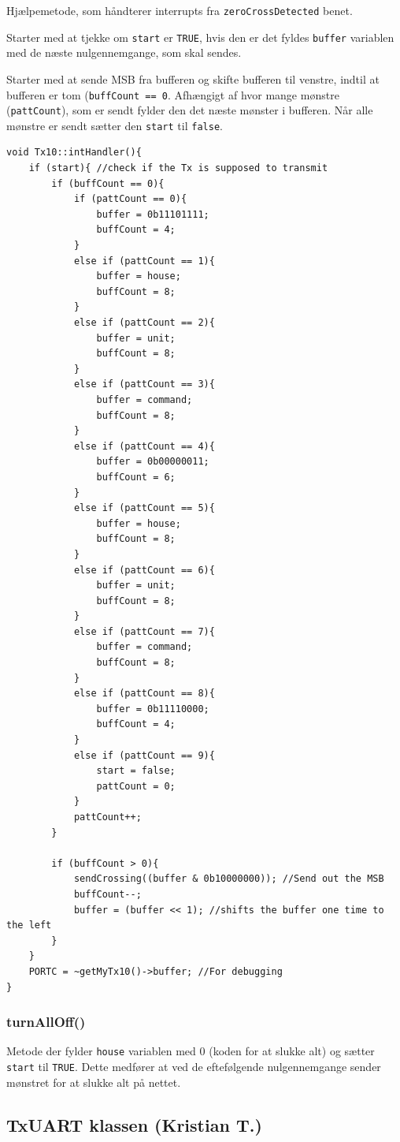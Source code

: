 Hjælpemetode, som håndterer interrupts fra \texttt{zeroCrossDetected} benet. 

Starter med at tjekke om \texttt{start} er \texttt{TRUE}, hvis den er det fyldes \texttt{buffer} variablen med de næste nulgennemgange, som skal sendes. 

Starter med at sende MSB fra bufferen og skifte bufferen til venstre, indtil at bufferen er tom (\texttt{buffCount == 0}. Afhængigt af hvor mange mønstre (\texttt{pattCount}), som er sendt fylder den det næste mønster i bufferen. Når alle mønstre er sendt sætter den \texttt{start} til \texttt{false}.

\begin{lstlisting}
void Tx10::intHandler(){
	if (start){ //check if the Tx is supposed to transmit
		if (buffCount == 0){
			if (pattCount == 0){
				buffer = 0b11101111;
				buffCount = 4;
			}
			else if (pattCount == 1){
				buffer = house;
				buffCount = 8;
			}
			else if (pattCount == 2){
				buffer = unit;
				buffCount = 8;
			}
			else if (pattCount == 3){
				buffer = command;
				buffCount = 8;
			}
			else if (pattCount == 4){
				buffer = 0b00000011;
				buffCount = 6;
			}
			else if (pattCount == 5){
				buffer = house;
				buffCount = 8;
			}
			else if (pattCount == 6){
				buffer = unit;
				buffCount = 8;
			}
			else if (pattCount == 7){
				buffer = command;
				buffCount = 8;
			}
			else if (pattCount == 8){
				buffer = 0b11110000;
				buffCount = 4;
			}
			else if (pattCount == 9){
				start = false;
				pattCount = 0;
			}
			pattCount++;
		}
		
		if (buffCount > 0){
			sendCrossing((buffer & 0b10000000)); //Send out the MSB
			buffCount--;
			buffer = (buffer << 1); //shifts the buffer one time to the left
		}
	}
	PORTC = ~getMyTx10()->buffer; //For debugging
}
\end{lstlisting}

\subsubsection{turnAllOff()}
Metode der fylder \texttt{house} variablen med 0 (koden for at slukke alt) og sætter \texttt{start} til \texttt{TRUE}. Dette medfører at ved de eftefølgende nulgennemgange sender mønstret for at slukke alt på nettet.

\subsection{TxUART klassen (Kristian T.)} \label{TxUART}

